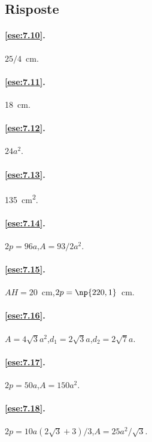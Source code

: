 \subsection{Risposte}

\begingroup
\hypersetup{linkcolor=black}

\paragraph{\ref{ese:7.10}.}
$25/4$~cm.

\paragraph{\ref{ese:7.11}.}
18~cm.

\paragraph{\ref{ese:7.12}.}
$24a^2$.

\paragraph{\ref{ese:7.13}.}
135~cm\textsuperscript{2}.

\paragraph{\ref{ese:7.14}.}
$2p=96a$,\quad $A=93/2a^2$.

\paragraph{\ref{ese:7.15}.}
$AH=20$~cm,\quad $2p=\np{220,1}$~cm.

\paragraph{\ref{ese:7.16}.}
$A=4\sqrt{3}a^2$,\quad $d_1=2\sqrt{3}a$,\quad $d_2=2\sqrt{7}a$.

\paragraph{\ref{ese:7.17}.}
$2p=50a$,\quad $A=150a^2$.

\paragraph{\ref{ese:7.18}.}
$2p=10a(2\sqrt{3}+3)/3$,\quad $A=25a^2/\sqrt{3}$.

